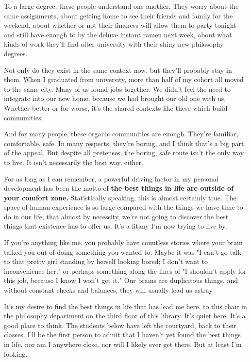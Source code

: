 \documentclass[]{book}
\begin{document}
To a large degree, these people understand one another. They worry about the
same assignments, about getting home to see their friends and family for the
weekend, about whether or not their finances will allow them to party tonight
and still have enough to by the deluxe instant ramen next week, about what kinds
of work they'll find after university with their shiny new philosophy degrees.

Not only do they exist in the same context now, but they'll probably stay in
them. When I graduated from university, more than half of my cohort all moved to
the same city. Many of us found jobs together. We didn't feel the need to
integrate into our new home, because we had brought our old one with us. Whether
better or for worse, it's the shared contexts like these which build
communities.

And for many people, these organic communities are enough. They're familiar,
comfortable, safe. In many respects, they're boring, and I think that's a big
part of the appeal. But despite all pretenses, the boring, safe route isn't the
only way to live. It isn't necessarily the best way, either.

For as long as I can remember, a powerful driving factor in my personal
development has been the motto of \textbf{the best things in life are outside of
your comfort zone.} Statistically speaking, this is almost certainly true. The
space of human experience is so large compared with the things we have time to
do in our life, that almost by necessity, we're not going to discover the best
things that existence has to offer us. It's a litany I'm now trying to live by.

If you're anything like me, you probably have countless stories where your brain
talked you out of doing something you wanted to. Maybe it was "I can't go talk
to that pretty girl standing by herself looking bored; I don't want to
inconvenience her," or perhaps something along the lines of "I shouldn't apply
for this job, because I know I won't get it." Our brains are duplicitous things,
and without constant checks and balances, they will usually lead us astray.

It's my desire to find the best things in life that has lead me here, to this
chair in the philosophy department on the third floor of this library. It's
quiet here. It's a good place to think. The students below have left the
courtyard, back to their classes. I'll be the first person to admit that I
haven't yet found the best things in life, nor am I anywhere close, nor will I
likely ever get there. But at least I'm looking.
\end{document}
